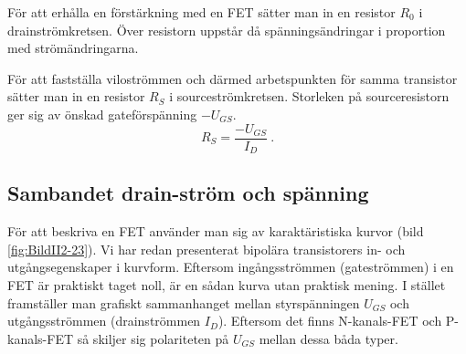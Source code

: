 För att erhålla en förstärkning med en FET sätter man in en resistor \(R_0\) i drainströmkretsen.
Över resistorn uppstår då spänningsändringar i proportion med strömändringarna.

För att fastställa viloströmmen och därmed arbetspunkten för samma transistor sätter man in en resistor \(R_S\) i sourceströmkretsen.
Storleken på sourceresistorn ger sig av önskad gateförspänning \(-U_{GS}\).
\[R_S = \dfrac{-U_{GS}}{I_D}~.\]


\subsection{Sambandet drain-ström och spänning}

För att beskriva en FET använder man sig av karaktäristiska kurvor (bild \ref{fig:BildII2-23}).
Vi har redan presenterat bipolära transistorers in- och utgångsegenskaper i kurvform.
Eftersom ingångsströmmen (gateströmmen) i en FET är praktiskt taget noll, är en sådan kurva utan praktisk mening.
I stället framställer man grafiskt sammanhanget mellan styrspänningen
\(U_{GS}\) och utgångsströmmen (drainströmmen \(I_D\)).
Eftersom det finns N-kanals-FET och P-kanals-FET så skiljer sig polariteten på \(U_{GS}\) mellan dessa båda typer.

